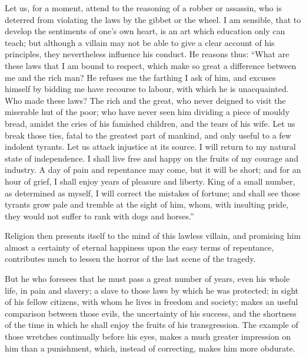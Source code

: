 Let us, for a moment, attend to the reasoning of a robber or
assassin, who is deterred from violating the laws by the gibbet or the
wheel. I am sensible, that to develop the sentiments of one's own
heart, is an art which education only can teach; but although a
villain may not be able to give a clear account of his principles,
they nevertheless influence his conduct. He reasons thus: ``What are
these laws that I am bound to respect, which make so great a
difference between me and the rich man? He refuses me the farthing I
ask of him, and excuses himself by bidding me have recourse to labour,
with which he is unacquainted. Who made these laws? The rich and the
great, who never deigned to visit the miserable hut of the poor; who
have never seen him dividing a piece of mouldy bread, amidst the cries
of his famished children, and the tears of his wife. Let us break
those ties, fatal to the greatest part of mankind, and only useful to
a few indolent tyrants. Let us attack injustice at its source. I will
return to my natural state of independence. I shall live free and
happy on the fruits of my courage and industry. A day of pain and
repentance may come, but it will be short; and for an hour of grief, I
shall enjoy years of pleasure and liberty. King of a small number, as
determined  as myself, I will correct the mistakes of
fortune; and shall see those tyrants grow pale and tremble at the
sight of him, whom, with insulting pride, they would not suffer to
rank with dogs and horses.''

Religion then presents itself to the mind of this lawless villain, and
promising him almost a certainty of eternal happiness upon the easy
terms of repentance, contributes much to lessen the horror of the last
scene of the tragedy.

But he who foresees that he must pass a great number of years, even
his whole life, in pain and slavery; a slave to those laws by which he
was protected; in sight of his fellow citizens, with whom he lives in
freedom and society; makes an useful comparison between those evils,
the uncertainty of his success, and the shortness of the time in which
he shall enjoy the fruits of his transgression. The example of those
wretches continually before his eyes, makes a much greater impression
on him than a punishment, which, instead of correcting, makes him more
obdurate.

